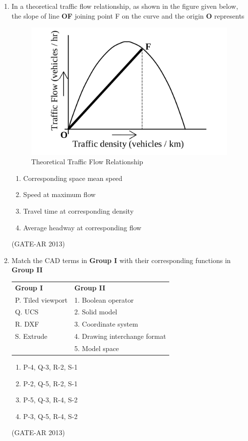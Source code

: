 \documentclass[a4paper,10pt]{article}
\begin{document}
\begin{enumerate}
    \item In a theoretical traffic flow relationship, as shown in the figure given below, the slope of line \textbf{OF} joining point F on the curve and the origin \textbf{O} represents \\
    \begin{figure}[h!]
    \centering
    \includegraphics[width=0.5\linewidth]{figs/01.jpg}
    \caption{Theoretical Traffic Flow Relationship}
    \label{fig:Img01}
    \end{figure}
    \begin{multicols}{2}
	\begin{enumerate}
        \item Corresponding space mean speed
        \item Speed at maximum flow
        \item Travel time at corresponding density
        \item Average headway at corresponding flow
    \end{enumerate}
	\end{multicols}
    \hfill (GATE-AR 2013)

    \item Match the CAD terms in \textbf{Group I} with their corresponding functions in \textbf{Group II} \\
    \begin{tabular}{ l l }
	\textbf{Group I} & \textbf{Group II} \\
	P. Tiled viewport & 1. Boolean operator \\
	Q. UCS & 2. Solid model \\
	R. DXF & 3. Coordinate system \\
	S. Extrude & 4. Drawing interchange format \\
	& 5. Model space \\
	\end{tabular}
	\begin{multicols}{2}
	\begin{enumerate}
        \item P-4, Q-3, R-2, S-1
        \item P-2, Q-5, R-2, S-1
        \item P-5, Q-3, R-4, S-2
        \item P-3, Q-5, R-4, S-2
    \end{enumerate}
	\end{multicols}
    \hfill (GATE-AR 2013)


\end{enumerate}
\end{document}
